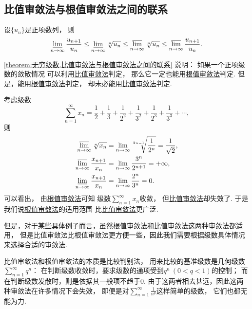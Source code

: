 \subsection{比值审敛法与根值审敛法之间的联系}
\begin{theorem}\label{theorem:无穷级数.比值审敛法与根值审敛法之间的联系}
设\(\{u_n\}\)是正项数列，
则\[
	\varliminf_{n\to\infty} \frac{u_{n+1}}{u_n}
	\leq
	\varliminf_{n\to\infty} \sqrt[n]{u_n}
	\leq
	\varlimsup_{n\to\infty} \sqrt[n]{u_n}
	\leq
	\varlimsup_{n\to\infty} \frac{u_{n+1}}{u_n}.
\]
\end{theorem}
\begin{remark}
\cref{theorem:无穷级数.比值审敛法与根值审敛法之间的联系} 说明：
如果一个正项级数的敛散情况
可以利用\hyperref[theorem:无穷级数.正项级数的比值审敛法]{比值审敛法}判定，
那么它一定也能用\hyperref[theorem:无穷级数.正项级数的根值审敛法]{根值审敛法}判定.
但是，能用\hyperref[theorem:无穷级数.正项级数的根值审敛法]{根值审敛法}判定，
却未必能用\hyperref[theorem:无穷级数.正项级数的比值审敛法]{比值审敛法}判定.
\end{remark}

\begin{example}
考虑级数\[
	\sum_{n=1}^\infty x_n
	= \frac12 + \frac13
	+ \frac1{2^2} + \frac1{3^2}
	+ \frac1{2^3} + \frac1{3^3}
	+ \dotsb,
\]
则\begin{align*}
	\varlimsup_{n\to\infty} \sqrt[n]{x_n}
	&= \lim_{n\to\infty} \sqrt[2n-1]{\frac1{2^n}}
	= \frac1{\sqrt2}, \\
	\varlimsup_{n\to\infty} \frac{x_{n+1}}{x_n}
	&= \lim_{n\to\infty} \frac{3^n}{2^{n+1}}
	= +\infty, \\
	\varliminf_{n\to\infty} \frac{x_{n+1}}{x_n}
	&= \lim_{n\to\infty} \frac{2^n}{3^n}
	= 0.
\end{align*}
可以看出，
由\hyperref[theorem:无穷级数.正项级数的根值审敛法]{根值审敛法}可知
级数\(\sum_{n=1}^\infty x_n\)收敛，
但\hyperref[theorem:无穷级数.正项级数的比值审敛法]{比值审敛法}却失效了.
于是我们说\hyperref[theorem:无穷级数.正项级数的根值审敛法]{根值审敛法}的适用范围
比\hyperref[theorem:无穷级数.正项级数的比值审敛法]{比值审敛法}更广泛.
\end{example}

但是，对于某些具体例子而言，虽然根值审敛法和比值审敛法这两种审敛法都适用，
但是比值审敛法比根值审敛法更方便一些，因此我们需要根据级数具体情况来选择合适的审敛法.

比值审敛法和根值审敛法的本质是比较判别法，
用来比较的基准级数是几何级数\(\sum_{n=1}^\infty q^n\)：
在判断级数收敛时，要求级数的通项受到\(q^n\ (0<q<1)\)的控制；
而在判断级数发散时，则是依据其一般项不趋于0.
由于这两者相去甚远，因此这两种审敛法在许多情况下会失效，
即便是对\(\sum_{n=1}^\infty \frac1{n^p}\)这样简单的级数，
它们也都无能为力.

